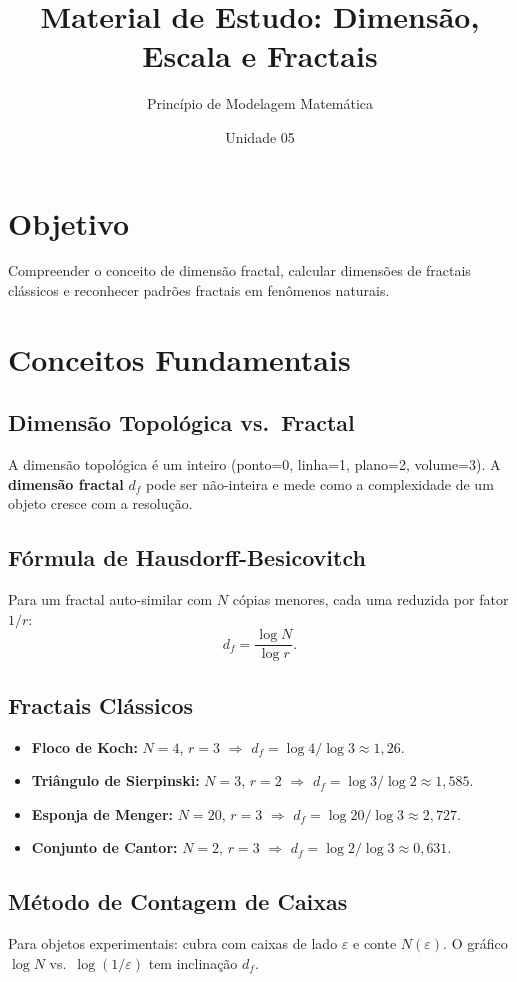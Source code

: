 \documentclass[12pt,a4paper]{article}
\title{Material de Estudo: Dimens\~ao, Escala e Fractais}
\author{Princ\'ipio de Modelagem Matem\'atica}
\date{Unidade 05}
\begin{document}
\maketitle

\section*{Objetivo}
Compreender o conceito de dimens\~ao fractal, calcular dimens\~oes de fractais cl\'assicos e reconhecer padr\~oes fractais em fen\^omenos naturais.

\section*{Conceitos Fundamentais}

\subsection*{Dimens\~ao Topol\'ogica vs.\ Fractal}
A dimens\~ao topol\'ogica \'e um inteiro (ponto=0, linha=1, plano=2, volume=3).
A \textbf{dimens\~ao fractal} $d_f$ pode ser n\~ao-inteira e mede como a complexidade de um objeto cresce com a resolu\c{c}\~ao.

\subsection*{F\'ormula de Hausdorff-Besicovitch}
Para um fractal auto-similar com $N$ c\'opias menores, cada uma reduzida por fator $1/r$:
\[
d_f = \frac{\log N}{\log r}.
\]

\subsection*{Fractais Cl\'assicos}
\begin{itemize}
  \item \textbf{Floco de Koch:} $N=4$, $r=3$ $\Rightarrow$ $d_f = \log 4 / \log 3 \approx 1{,}26$.
  \item \textbf{Tri\^angulo de Sierpinski:} $N=3$, $r=2$ $\Rightarrow$ $d_f = \log 3 / \log 2 \approx 1{,}585$.
  \item \textbf{Esponja de Menger:} $N=20$, $r=3$ $\Rightarrow$ $d_f = \log 20 / \log 3 \approx 2{,}727$.
  \item \textbf{Conjunto de Cantor:} $N=2$, $r=3$ $\Rightarrow$ $d_f = \log 2 / \log 3 \approx 0{,}631$.
\end{itemize}

\subsection*{M\'etodo de Contagem de Caixas}
Para objetos experimentais: cubra com caixas de lado $\varepsilon$ e conte $N(\varepsilon)$. O gr\'afico $\log N$ vs.\ $\log(1/\varepsilon)$ tem inclina\c{c}\~ao $d_f$.
\end{document}
